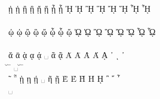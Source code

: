 \documentclass[a4paper]{article}
\begin{document}
{  ᾐ   ᾑ   ᾒ   ᾓ   ᾔ   ᾕ   ᾖ    ᾗ    ᾘ   ᾙ   ᾚ   ᾛ   ᾜ   ᾝ   ᾞ  ᾟ \\
  \accpsili\texteta\ypogegrammeni{}
  \accdasia\texteta\ypogegrammeni{}
  \accpsilivaria\texteta\ypogegrammeni{}
  \accdasiavaria\texteta\ypogegrammeni{}
  \accpsilioxia\texteta\ypogegrammeni{}
  \accdasiaoxia\texteta\ypogegrammeni{}
  \accpsiliperispomeni\texteta\ypogegrammeni{}
  \accdasiaperispomeni\texteta\ypogegrammeni{}
  \accpsili\textEta\ypogegrammeni{}
  \accdasia\textEta\ypogegrammeni{}
  \accpsilivaria\textEta\ypogegrammeni{}
  \accdasiavaria\textEta\ypogegrammeni{}
  \accpsilioxia\textEta\ypogegrammeni{}
  \accdasiaoxia\textEta\ypogegrammeni{}
  \accpsiliperispomeni\textEta\ypogegrammeni{}
  \accdasiaperispomeni\textEta\ypogegrammeni{} \\

  ᾠ   ᾡ   ᾢ   ᾣ   ᾤ   ᾦ   ᾧ    ᾥ    ᾨ   ᾩ   ᾪ   ᾫ   ᾬ   ᾭ   ᾮ  ᾯ \\
  \accpsili\textomega\ypogegrammeni{}
  \accdasia\textomega\ypogegrammeni{}
  \accpsilivaria\textomega\ypogegrammeni{}
  \accdasiavaria\textomega\ypogegrammeni{}
  \accpsilioxia\textomega\ypogegrammeni{}
  \accdasiaoxia\textomega\ypogegrammeni{}
  \accpsiliperispomeni\textomega\ypogegrammeni{}
  \accdasiaperispomeni\textomega\ypogegrammeni{}
  \accpsili\textOmega\ypogegrammeni{}
  \accdasia\textOmega\ypogegrammeni{}
  \accpsilivaria\textOmega\ypogegrammeni{}
  \accdasiavaria\textOmega\ypogegrammeni{}
  \accpsilioxia\textOmega\ypogegrammeni{}
  \accdasiaoxia\textOmega\ypogegrammeni{}
  \accpsiliperispomeni\textOmega\ypogegrammeni{}
  \accdasiaperispomeni\textOmega\ypogegrammeni{} \\

  ᾰ   ᾱ   ᾲ   ᾳ   ᾴ   ␣   ᾶ    ᾷ    Ᾰ   Ᾱ   Ὰ   Ά   ᾼ   ᾽   ι  ᾿ \\
  \u\textalpha{}
  \=\textalpha{}
  \accvaria\textalpha\ypogegrammeni{}
  \textalpha\ypogegrammeni{}
  \accoxia\textalpha\ypogegrammeni{}
  ␣ \accperispomeni\textalpha{}
  \accperispomeni\textalpha\ypogegrammeni{}
  \u\textAlpha{}
  \=\textAlpha{}
  \accvaria\textAlpha{}
  \accoxia\textAlpha{}
  \textAlpha\ypogegrammeni{}
  \accpsili{}
  \prosgegrammeni{}
  \accpsili{} \\

  ῀   ῁   ῂ   ῃ   ῄ   ␣   ῆ    ῇ    Ὲ   Έ   Ὴ   Ή   ῌ   ῍   ῎  ῏ \\
  \accperispomeni{}
  \accdialytikaperispomeni{}
  \accvaria\texteta\ypogegrammeni{}
  \texteta\ypogegrammeni{}
  \accoxia\texteta\ypogegrammeni{}
  ␣ \accperispomeni\texteta{}
  \accperispomeni\texteta\ypogegrammeni{}
  \accvaria\textEpsilon{}
  \accoxia\textEpsilon{}
  \accvaria\textEta{}
  \accoxia\textEta{}
  \textEta\ypogegrammeni{}
  \accpsilivaria{}
  \accpsilioxia{}
  \accpsiliperispomeni{} \\

}
\end{document}
